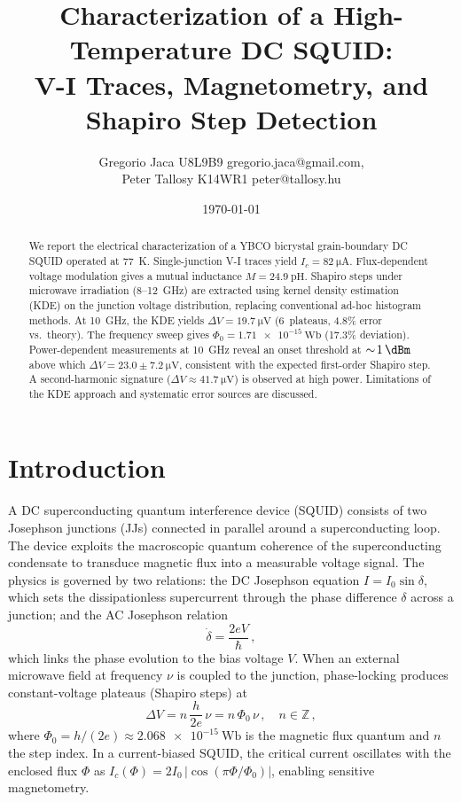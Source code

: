 \documentclass[12pt,a4paper]{article}
\title{Characterization of a High-Temperature DC SQUID:\\
V-I Traces, Magnetometry, and Shapiro Step Detection}
\author{Gregorio Jaca U8L9B9 gregorio.jaca@gmail.com, \\
Peter Tallosy K14WR1 peter@tallosy.hu}
\date{\today}
\begin{document}
\maketitle

\begin{abstract}
We report the electrical characterization of a YBCO bicrystal grain-boundary
DC SQUID operated at \SI{77}{\kelvin}. Single-junction V-I traces yield
$I_c = \SI{82}{\micro\ampere}$. Flux-dependent voltage modulation gives a mutual
inductance $M = \SI{24.9}{\pico\henry}$. Shapiro steps under microwave irradiation
(8--12~GHz) are extracted using kernel density estimation (KDE) on the junction
voltage distribution, replacing conventional ad-hoc histogram methods. At
\SI{10}{\giga\hertz}, the KDE yields $\Delta V = \SI{19.7}{\micro\volt}$
(6~plateaus, 4.8\% error vs.\ theory). The frequency sweep gives
$\Phi_0 = \SI{1.71e-15}{\weber}$ (17.3\% deviation).  Power-dependent
measurements at \SI{10}{\giga\hertz} reveal an onset threshold at
$\sim\!\SI{1}{\dBm}$ above which $\Delta V = 23.0 \pm \SI{7.2}{\micro\volt}$,
consistent with the expected first-order Shapiro step. A second-harmonic signature
($\Delta V \approx \SI{41.7}{\micro\volt}$) is observed at high power. Limitations
of the KDE approach and systematic error sources are discussed.
\end{abstract}


\section{Introduction}

A DC superconducting quantum interference device (SQUID) consists of two Josephson
junctions (JJs) connected in parallel around a superconducting loop. The device
exploits the macroscopic quantum coherence of the superconducting condensate to
transduce magnetic flux into a measurable voltage signal. The physics is governed
by two relations: the DC Josephson equation $I = I_0 \sin\delta$, which sets the
dissipationless supercurrent through the phase difference $\delta$ across a junction;
and the AC Josephson relation
\begin{equation}
    \dot\delta = \frac{2eV}{\hbar}\,,
    \label{eq:ac_josephson}
\end{equation}
which links the phase evolution to the bias voltage $V$. When an external microwave
field at frequency $\nu$ is coupled to the junction, phase-locking produces
constant-voltage plateaus (Shapiro steps) at
\begin{equation}
    \Delta V = n\,\frac{h}{2e}\,\nu = n\,\Phi_0\,\nu\,, \quad n \in \mathbb{Z}\,,
    \label{eq:shapiro}
\end{equation}
%
where $\Phi_0 = h/(2e) \approx \SI{2.068e-15}{\weber}$ is the magnetic flux quantum
and $n$ the step index. In a current-biased SQUID, the critical current oscillates
with the enclosed flux $\Phi$ as
$I_c(\Phi) = 2I_0\,|\cos(\pi\Phi/\Phi_0)|$,
enabling sensitive magnetometry.
\end{document}
